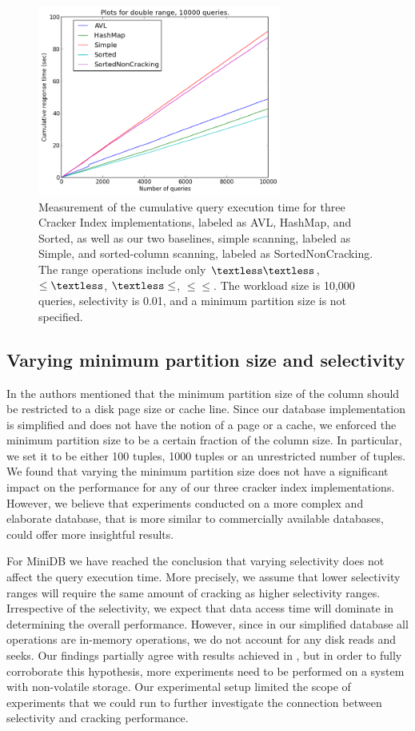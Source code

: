 \begin{figure}[h]
\includegraphics[width=8cm]{figures/double10000}
\caption{Measurement of the cumulative query execution time for three Cracker Index implementations, labeled as AVL, HashMap, and Sorted, as well as our two baselines, simple scanning, labeled as Simple, and sorted-column scanning, labeled as SortedNonCracking. The range operations include only $\textless\textless$, $\leq\textless$, $\textless\leq$, $\leq\leq$. The workload size is 10,000 queries, selectivity is 0.01, and a minimum partition size is not specified.}
\label{fig:double10000}
\end{figure}

\subsection{Varying minimum partition size and selectivity}
In \cite{idreos_2007} the authors mentioned that the minimum partition size of the column should be restricted to a disk page size or cache line. Since our database implementation is simplified and does not have the notion of a page or a cache, we enforced the minimum partition size to be a certain fraction of the column size. In particular, we set it to be either 100 tuples, 1000 tuples or an unrestricted number of tuples. We found that varying the minimum partition size does not have a significant impact on the performance for any of our three cracker index implementations. However, we believe that experiments conducted on a more complex and elaborate database, that is more similar to commercially available databases, could offer more insightful results. 

For MiniDB we have reached the conclusion that varying selectivity does not affect the query execution time. More precisely, we assume that lower selectivity ranges will require the same amount of cracking as higher selectivity ranges. Irrespective of the selectivity, we expect that data access time will dominate in determining the overall performance. However, since in our simplified database all operations are in-memory operations, we do not account for any disk reads and seeks. Our findings partially agree with results achieved in \cite{schuhknecht_2014}, but in order to fully corroborate this hypothesis, more experiments need to be performed on a system with non-volatile storage. Our experimental setup limited the scope of experiments that we could run to further investigate the connection between selectivity and cracking performance.


